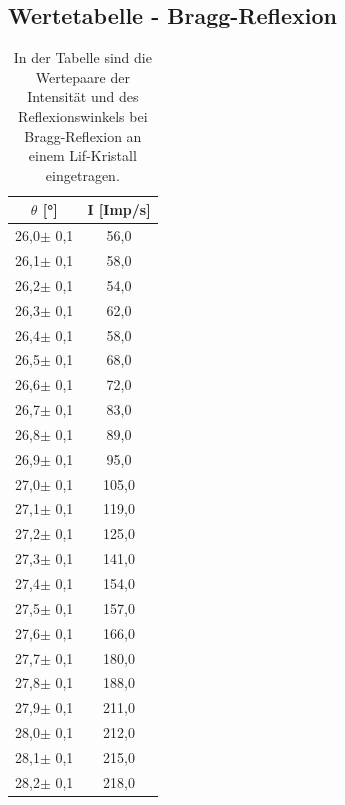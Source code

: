 \documentclass[titlepage = firstcover]{scrartcl}
\begin{document}
            \subsection{Wertetabelle - Bragg-Reflexion}
            \begin{table}
              \centering
              \caption{In der Tabelle sind die Wertepaare der Intensität und des Reflexionswinkels bei Bragg-Reflexion an einem Lif-Kristall eingetragen.}

              \begin{tabular} {c c}
                \toprule
                {$\theta$ [°]} & {I [Imp/s]}  \\
                \midrule
                26,0$\pm$ 0,1 & 	56,0    \\
                26,1$\pm$ 0,1 & 	58,0    \\
                26,2$\pm$ 0,1 & 	54,0    \\
                26,3$\pm$ 0,1 & 	62,0    \\
                26,4$\pm$ 0,1 & 	58,0    \\
                26,5$\pm$ 0,1 & 	68,0    \\
                26,6$\pm$ 0,1 & 	72,0    \\
                26,7$\pm$ 0,1 & 	83,0    \\
                26,8$\pm$ 0,1 & 	89,0    \\
                26,9$\pm$ 0,1 & 	95,0    \\
                27,0$\pm$ 0,1 & 	105,0   \\
                27,1$\pm$ 0,1 & 	119,0   \\
                27,2$\pm$ 0,1 & 	125,0   \\
                27,3$\pm$ 0,1 & 	141,0   \\
                27,4$\pm$ 0,1 & 	154,0   \\
                27,5$\pm$ 0,1 & 	157,0   \\
                27,6$\pm$ 0,1 & 	166,0   \\
                27,7$\pm$ 0,1 & 	180,0   \\
                27,8$\pm$ 0,1 & 	188,0   \\
                27,9$\pm$ 0,1 & 	211,0   \\
                28,0$\pm$ 0,1 & 	212,0   \\
                28,1$\pm$ 0,1 & 	215,0   \\
                28,2$\pm$ 0,1 & 	218,0   \\

\end{tabular}
\end{table}
\end{document}
